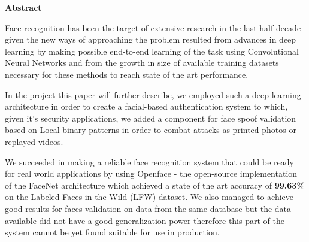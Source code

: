 \thispagestyle{plain}

\vspace*{\fill}

\begin{center}
	\Large \textbf{Abstract}	
\end{center}

Face recognition has been the target of extensive research in the last half decade given the new ways of approaching the problem resulted from advances in deep learning by making possible end-to-end learning of the task using Convolutional Neural Networks and from the growth in size of available training datasets necessary for these methods to reach state of the art performance. 

In the project this paper will further describe, we employed such a deep learning architecture in order to create a facial-based authentication system to which, given it's security applications, we added a component for face spoof validation based on Local binary patterns in order to combat attacks as printed photos or replayed videos.

We succeeded in making a reliable face recognition system that could be ready for real world applications by using Openface \cite{amos2016openface} - the open-source implementation of the FaceNet \cite{SchroffKP15} architecture which achieved a state of the art accuracy of \textbf{99.63\%}  on the Labeled Faces in the Wild (LFW) dataset. We also managed to achieve good results for faces validation on data from the same database but the data available did not have a good generalization power therefore this part of the system cannot be yet found suitable for use in production.


\vspace*{\fill}

